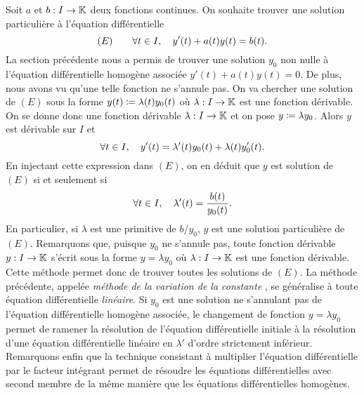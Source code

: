 \documentclass{magnolia}
\begin{document}
\begin{remarques}
\remarque
  Soit $a$ et $b:I\to\mathbb{K}$ deux fonctions continues. On souhaite trouver une solution
  particulière à l'équation différentielle
  \[(E) \qquad \forall t\in I ,\quad y'(t)+a(t)y(t)=b(t).\]
  La section précédente nous a permis de trouver une solution
  $y_0$ non nulle à l'équation différentielle homogène associée $y'(t)+a(t) y(t)=0$.
  De plus, nous avons vu qu'une telle fonction ne s'annule pas. On va chercher une solution
  de $(E)$ sous la forme $y(t)\coloneqq \lambda(t) y_0(t)$ où $\lambda:I\to\mathbb{K}$ est une
  fonction dérivable. On se donne donc une fonction dérivable $\lambda:I\to\mathbb{K}$
  et on pose $y\coloneqq\lambda y_0$.  Alors $y$ est dérivable sur $I$ et
  \[\forall t\in I ,\quad y'(t)=\lambda'(t)y_0(t)+\lambda(t)y_0'(t).\]
  En injectant cette expression dans $(E)$, on en déduit que $y$ est
  solution de $(E)$ si et seulement si
  \[\forall t\in I ,\quad \lambda'(t)=\frac{b(t)}{y_0(t)}.\]
  En particulier, si $\lambda$ est une primitive de $b/y_0$, $y$ est
  une solution \og particulière \fg de $(E)$. Remarquons que, puisque
  $y_0$ ne s'annule pas, toute fonction dérivable $y:I\to\mathbb{K}$ s'écrit sous la forme $y=\lambda y_0$ où
  $\lambda:I\to\mathbb{K}$ est une fonction dérivable.
  Cette méthode permet donc de trouver toutes les solutions de $(E)$.
\remarque La méthode précédente, appelée \og
  \textit{méthode de la variation de la constante} \fg,
  se généralise à toute équation différentielle \textit{linéaire}. Si $y_0$ est une
  solution ne s'annulant pas de l'équation différentielle homogène associée,
  le changement de fonction
  $y=\lambda y_0$ permet de ramener la résolution de l'équation différentielle
  initiale à la résolution d'une équation différentielle linéaire en $\lambda'$
  d'ordre strictement inférieur.
\remarque Remarquons enfin que la technique consistant à multiplier l'équation différentielle par le facteur
  intégrant permet de résoudre les équations différentielles avec second membre de la même manière que
  les équations différentielles homogènes.
\end{remarques}
\vspace{2ex}
\end{document}
